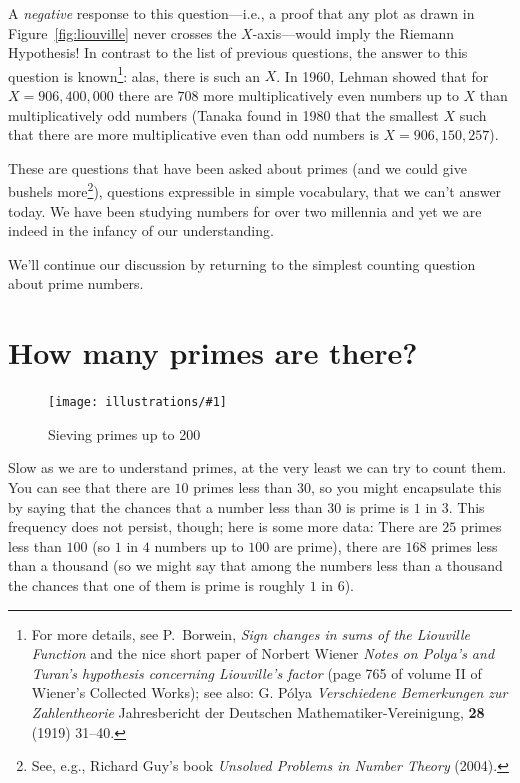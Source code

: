 \documentclass[openany]{book}
\newcommand{\ill}[3]{%
   \begin{figure}[H]%
   \vspace{-2ex}
   \centering%
   \texttt{[image: illustrations/\#1]}%
   \caption{#3}%
   \vspace{-2ex}
    \end{figure}}
\theoremstyle{plain}
\theoremstyle{definition}
\begin{document}
A {\em negative} response to this question---i.e., a proof that any
plot as drawn in Figure~\ref{fig:liouville} never crosses
the $X$-axis---would imply the Riemann Hypothesis!  In contrast to the list of
previous questions, the answer to this question is known\footnote{For more
  details, see P.~Borwein, {\em Sign changes in sums of the Liouville
    Function} and the nice short paper of Norbert Wiener {\em Notes on
    Polya's and Turan's hypothesis concerning Liouville's factor}
  (page 765 of volume II of Wiener's Collected Works); see also:
  G. P\'{o}lya {\em Verschiedene Bemerkungen zur Zahlentheorie}
  Jahresbericht der Deutschen Mathematiker-Vereinigung, {\bf 28} (1919)
  31--40.}: alas, there is such an $X$.  In 1960, Lehman showed that
for $X=906{,}400{,}000$ there are $708$ more multiplicatively even numbers
up to $X$ than multiplicatively odd numbers (Tanaka found in 1980 that
the smallest $X$ such that there are more multiplicative even than odd
numbers is $X=906{,}150{,}257$).

These are questions that have been asked about primes (and we could
give bushels more\footnote{See, e.g., Richard Guy's book {\em Unsolved Problems in Number Theory} (2004).}),
questions expressible in simple vocabulary, that
we can't answer today. We have been studying numbers for over two
millennia and yet we are indeed in the infancy of our understanding.


We'll continue our discussion by returning to the simplest counting
question about prime numbers.

\chapter{How many primes are there?}

\ill{sieve200}{.8}{Sieving primes up to 200}

Slow as we are to understand primes, at the very least we can try to
count them. You can see that there are $10$ primes less than $30$, so
you might encapsulate this by saying that the chances that a number
less than $30$ is prime is $1$ in $3$.  This frequency does not
persist, though; here is some more data: There are $25$ primes less
than $100$ (so $1$ in $4$ numbers up to $100$ are prime), there are
$168$ primes less than a thousand (so we might say that among the
numbers less than a thousand the chances that one of them is prime is
roughly $1$ in $6$).
\end{document}
